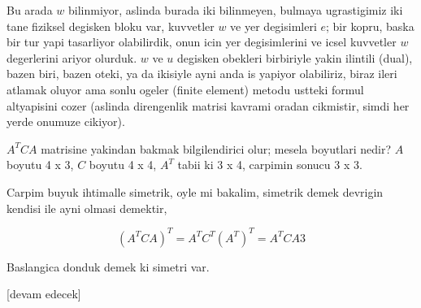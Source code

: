 \documentclass[12pt,fleqn]{article}\usepackage{../../common}
\begin{document}
Bu arada $w$ bilinmiyor, aslinda burada iki bilinmeyen, bulmaya ugrastigimiz iki
tane fiziksel degisken bloku var, kuvvetler $w$ ve yer degisimleri $e$; bir
kopru, baska bir tur yapi tasarliyor olabilirdik, onun icin yer degisimlerini ve
icsel kuvvetler $w$ degerlerini ariyor olurduk. $w$ ve $u$ degisken obekleri
birbiriyle yakin ilintili (dual), bazen biri, bazen oteki, ya da ikisiyle ayni
anda is yapiyor olabiliriz, biraz ileri atlamak oluyor ama sonlu ogeler (finite
element) metodu ustteki formul altyapisini cozer (aslinda direngenlik matrisi
kavrami oradan cikmistir, simdi her yerde onumuze cikiyor).

$A^T C A$ matrisine yakindan bakmak bilgilendirici olur; mesela boyutlari nedir?
$A$ boyutu 4 x 3, $C$ boyutu 4 x 4, $A^T$ tabii ki 3 x 4, carpimin sonucu 3 x 3.

Carpim buyuk ihtimalle simetrik, oyle mi bakalim, simetrik demek devrigin
kendisi ile ayni olmasi demektir, 

$$
(A^T C A)^T = A^T C^T (A^T)^T = A^T C A 3
$$

Baslangica donduk demek ki simetri var.



[devam edecek]
\end{document}
